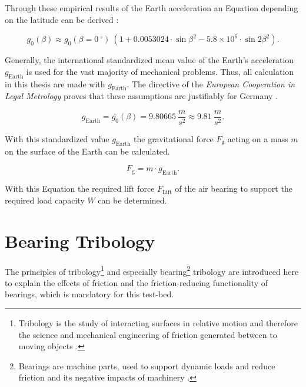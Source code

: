 Through these empirical results of the Earth acceleration an Equation depending on the latitude can be derived \cite{Demtroder.2017}:

\begin{equation}
g_\text{0}(\beta) \approx g_\text{0}(\beta = 0 \ ^\circ) \ (1 + 0.0053024 \cdot \sin \beta^{2} - 5.8 \times10^{6} \cdot \sin 2\beta^{2}).
\label{eqn:LawOfGravity55}
\end{equation}

Generally, the international standardized mean value of the Earth's acceleration $g_\text{Earth}$ is used for the vast majority of mechanical problems. Thus, all calculation in this thesis are made with $g_\text{Earth}$.
The directive of the \textit{European Cooperation in Legal Metrology} proves that these assumptions are justifiably for Germany \cite{EuropeanCooperationinLegalMetrologyWELMEC.15.06.1999}.

\begin{equation}
g_\text{Earth} = \bar{g_\text{0}}(\beta) = 9.80665 \ \frac{m}{s^{2}} \approx 9.81 \ \frac{m}{s^{2}} .
\label{eqn:LawOfGravity6}
\end{equation}

With this standardized value $g_\text{Earth}$ the gravitational force $F_\text{g}$ acting on a mass $m$ on the surface of the Earth can be calculated.

\begin{equation}
F_\text{g} = m \cdot g_\text{Earth}.
\label{eqn:GravForce}
\end{equation}

With this Equation the required lift force $F_\text{Lift}$ of the air bearing to support the required load capacity $W$ can be determined.


\section{Bearing Tribology}
The principles of tribology\footnote{Tribology is the study of interacting surfaces in relative motion and therefore the science and mechanical engineering of friction generated between to moving objects \cite{Qiu.2017}.} and especially bearing\footnote{Bearings are machine parts, used to support dynamic loads and reduce friction and its negative impacts of machinery  \cite{Qiu.2017}.} tribology are introduced here to explain the effects of friction and the friction-reducing functionality of bearings, which is mandatory for this test-bed.\\
 
